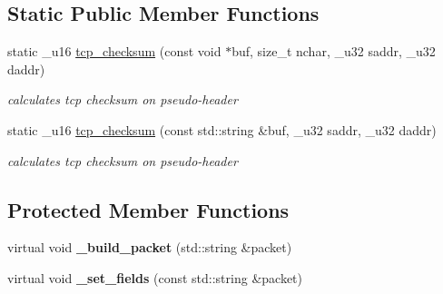 \subsection*{Static Public Member Functions}
\begin{CompactItemize}
\item 
static \_\-u16 \hyperlink{classsocketpp_1_1TCP__RawSocket_d0b16fff831e7e756a127cc47de4b9aa}{tcp\_\-checksum} (const void $\ast$buf, size\_\-t nchar, \_\-u32 saddr, \_\-u32 daddr)
\begin{CompactList}\small\item\em calculates tcp checksum on pseudo-header \item\end{CompactList}\item 
static \_\-u16 \hyperlink{classsocketpp_1_1TCP__RawSocket_59a27cc258c1007b2f7e68428fd50f80}{tcp\_\-checksum} (const std::string \&buf, \_\-u32 saddr, \_\-u32 daddr)
\begin{CompactList}\small\item\em calculates tcp checksum on pseudo-header \item\end{CompactList}\end{CompactItemize}
\subsection*{Protected Member Functions}
\begin{CompactItemize}
\item 
\hypertarget{classsocketpp_1_1TCP__RawSocket_d89a39d4bc91a76d0cb50da5cdd10fbc}{
virtual void \textbf{\_\-build\_\-packet} (std::string \&packet)}
\label{classsocketpp_1_1TCP__RawSocket_d89a39d4bc91a76d0cb50da5cdd10fbc}

\item 
\hypertarget{classsocketpp_1_1TCP__RawSocket_6976a4726503eef03a8d446afdbaddbe}{
virtual void \textbf{\_\-set\_\-fields} (const std::string \&packet)}
\label{classsocketpp_1_1TCP__RawSocket_6976a4726503eef03a8d446afdbaddbe}

\end{CompactItemize}
